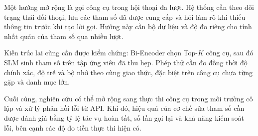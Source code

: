 Một hướng mở rộng là gọi công cụ trong hội thoại đa lượt. Hệ thống cần theo dõi trạng thái đối thoại, lưu các tham số đã được cung cấp và hỏi làm rõ khi thiếu thông tin trước khi tạo lời gọi. Hướng này cần bộ dữ liệu và độ đo riêng cho tính nhất quán của tham số qua nhiều lượt.

Kiến trúc lai cũng cần được kiểm chứng: Bi-Encoder chọn Top-$K$ công cụ, sau đó SLM sinh tham số trên tập ứng viên đã thu hẹp. Phép thử cần đo đồng thời độ chính xác, độ trễ và bộ nhớ theo cùng giao thức, đặc biệt trên công cụ chưa từng gặp và danh mục lớn.

Cuối cùng, nghiên cứu có thể mở rộng sang thực thi công cụ trong môi trường cô lập và xử lý phản hồi lỗi từ API. Khi đó, hiệu quả của cơ chế sửa tham số cần được đánh giá bằng tỷ lệ tác vụ hoàn tất, số lần gọi lại và khả năng kiểm soát lỗi, bên cạnh các độ đo tiền thực thi hiện có.

